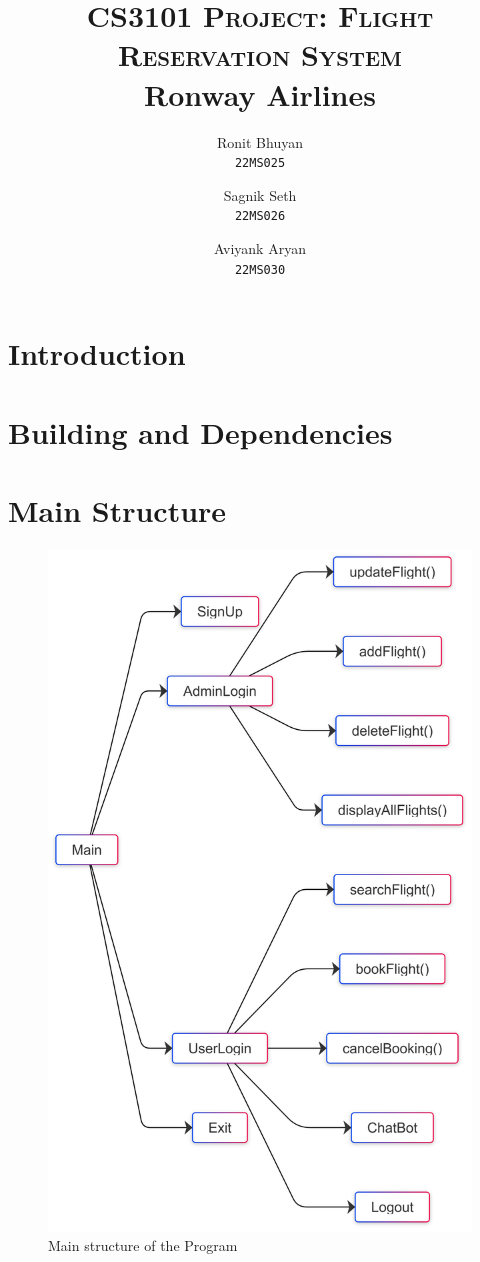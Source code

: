 \documentclass[a4paper]{scrartcl}
\title{
        \Large\textsc{CS3101 Project: Flight Reservation System} \\
        \vspace{10pt}
        \Huge\textbf{Ronway Airlines} \\
}
\author{Ronit Bhuyan \\ \texttt{22MS025} \and Sagnik Seth \\ \texttt{22MS026} \and   Aviyank Aryan \\ \texttt{22MS030}}
\date{}
\begin{document}
\maketitle
\tableofcontents
\section{Introduction}
\section{Building and Dependencies}
\section{Main Structure}


\begin{figure}[H]
    \centering
    \includegraphics[scale=0.1]{main structure.png}
    \caption{Main structure of the Program}
\end{figure}
\end{document}
